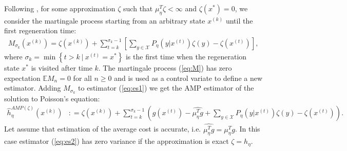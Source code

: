\documentclass[11pt]{article}
\newcommand{\E}{\mathbb{E}}
\newcommand{\X}{\mathcal{X}}
\theoremstyle{definition}
\numberwithin{equation}{section}
\begin{document}
Following \cite[Proposition 7]{Henderson2002}, for some approximation $\zeta$ such that   $\mu_\eta^T \zeta<\infty$ and $\zeta(x^*)=0$,
we consider the martingale process starting from an arbitrary state $x^{(k)}$  until the first regeneration time:
\begin{align}\label{eq:M}
M_{\sigma_k} (x^{(k)})=\zeta(x^{(k)}) +\sum\limits_{t=k}^{\sigma_k-1} \left[\sum\limits_{y\in \X} P_\eta\left(y|x^{(t)}\right)\zeta(y)  - \zeta(x^{(t)})\right],
\end{align}
where $\sigma_k = \min\left\{t>k~|~x^{(t)}=x^*\right\}$  is the first time when the regeneration state $x^*$ is visited after time $k$.
The martingale process (\ref{eq:M}) has zero expectation $\E M_n = 0$ for all $n\geq 0$ and is used as a control variate to define a new estimator. %
Adding $M_{\sigma_k}$ to estimator (\ref{eq:es1}) we get the AMP estimator of the solution to Poisson's equation:
\begin{align}\label{eq:es2}
\hat h_\eta^{AMP(\zeta)} (x^{(k)} )&: =\zeta(x^{(k)}) +  \sum\limits_{t=k}^{\sigma_k-1} \left(g(x^{(t) }) - \widehat {\mu_\eta^Tg} +\sum\limits_{y\in \X} P_\eta\left(y|x^{(t)}\right)\zeta(y) -\zeta(x^{(t)})  \right) .
\end{align}
Let assume that estimation of the average cost is accurate, i.e. $ \widehat {\mu_\eta^Tg}  = \mu_\eta^Tg$. In this case estimator (\ref{eq:es2}) has zero variance if the approximation is exact $\zeta = h_\eta$.



\end{document}

